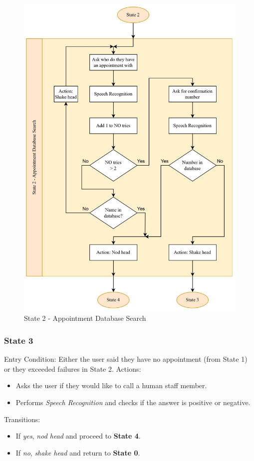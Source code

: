 \documentclass[conference]{IEEEtran}
\begin{document}
\begin{figure}
    \centering
    \includegraphics[width=.6\linewidth]{State 2 - Appointment Database Search.jpg}
    \caption{State 2 - Appointment Database Search}
    \label{State 2 - Appointment Database Search}
\end{figure}

\subsubsection{State 3}
Entry Condition:
Either the user said they have no appointment (from State 1) or they exceeded failures in State 2.
Actions:
\begin{itemize}
  \item Asks the user if they would like to call a human staff member.
  \item Performs \emph{Speech Recognition} and checks if the answer is positive or negative.
\end{itemize}
Transitions:
\begin{itemize}
  \item If \emph{yes}, \emph{nod head} and proceed to \textbf{State 4}.
  \item If \emph{no}, \emph{shake head} and return to \textbf{State 0}.
\end{itemize}
\end{document}
